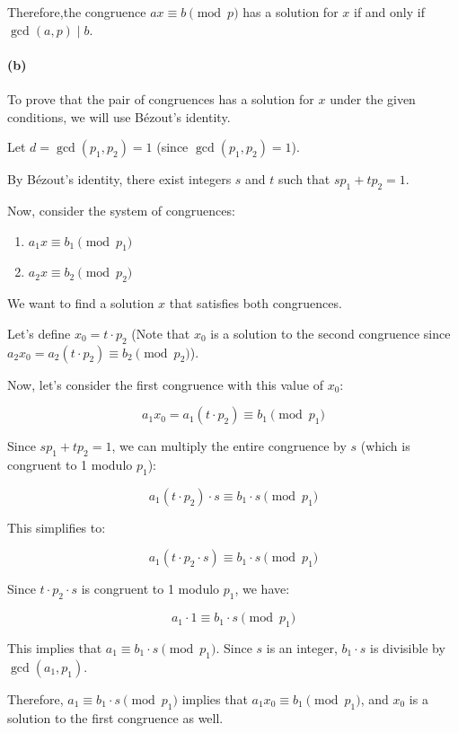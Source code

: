 \documentclass[12pt]{article}
\begin{document}
Therefore,the congruence $ax \equiv b \pmod{p}$ has a solution for $x$ if and only if $\gcd(a, p) \mid b$.
\paragraph{(b)}

To prove that the pair of congruences has a solution for \(x\) under the given conditions, we will use Bézout's identity.

Let \(d = \gcd(p_1, p_2) = 1\) (since \(\gcd(p_1, p_2) = 1\)).

By Bézout's identity, there exist integers \(s\) and \(t\) such that \(sp_1 + tp_2 = 1\).

Now, consider the system of congruences:

\begin{enumerate}
  \item \(a_1x \equiv b_1 \pmod{p_1}\)
  \item \(a_2x \equiv b_2 \pmod{p_2}\)
\end{enumerate}

We want to find a solution \(x\) that satisfies both congruences.

Let's define \(x_0 = t \cdot p_2\) (Note that \(x_0\) is a solution to the second congruence since \(a_2x_0 = a_2(t \cdot p_2) \equiv b_2 \pmod{p_2}\)).

Now, let's consider the first congruence with this value of \(x_0\):

\[a_1x_0 = a_1(t \cdot p_2) \equiv b_1 \pmod{p_1}\]

Since \(sp_1 + tp_2 = 1\), we can multiply the entire congruence by \(s\) (which is congruent to 1 modulo \(p_1\)):

\[a_1(t \cdot p_2) \cdot s \equiv b_1 \cdot s \pmod{p_1}\]

This simplifies to:

\[a_1(t \cdot p_2 \cdot s) \equiv b_1 \cdot s \pmod{p_1}\]

Since \(t \cdot p_2 \cdot s\) is congruent to 1 modulo \(p_1\), we have:

\[a_1 \cdot 1 \equiv b_1 \cdot s \pmod{p_1}\]

This implies that \(a_1 \equiv b_1 \cdot s \pmod{p_1}\). Since \(s\) is an integer, \(b_1 \cdot s\) is divisible by \(\gcd(a_1, p_1)\).

Therefore, \(a_1 \equiv b_1 \cdot s \pmod{p_1}\) implies that \(a_1x_0 \equiv b_1 \pmod{p_1}\), and \(x_0\) is a solution to the first congruence as well.
\end{document}
